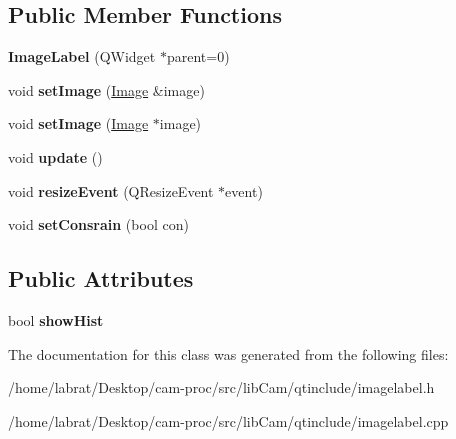 \subsection*{Public Member Functions}
\begin{DoxyCompactItemize}
\item 
{\bfseries Image\+Label} (Q\+Widget $\ast$parent=0)\hypertarget{classImageLabel_a01bf7ab77bbe3d5d3f58b1cdcccc8667}{}\label{classImageLabel_a01bf7ab77bbe3d5d3f58b1cdcccc8667}

\item 
void {\bfseries set\+Image} (\hyperlink{classImage}{Image} \&image)\hypertarget{classImageLabel_af04e4b40ac5eb1eb9b612540dd6466a1}{}\label{classImageLabel_af04e4b40ac5eb1eb9b612540dd6466a1}

\item 
void {\bfseries set\+Image} (\hyperlink{classImage}{Image} $\ast$image)\hypertarget{classImageLabel_a1960c3181366b630f54b36e50984f6fd}{}\label{classImageLabel_a1960c3181366b630f54b36e50984f6fd}

\item 
void {\bfseries update} ()\hypertarget{classImageLabel_a9831f92c604b3e847cd4c02cd861688c}{}\label{classImageLabel_a9831f92c604b3e847cd4c02cd861688c}

\item 
void {\bfseries resize\+Event} (Q\+Resize\+Event $\ast$event)\hypertarget{classImageLabel_a7b3da1fd9ca738eb988c7d5743bab2e4}{}\label{classImageLabel_a7b3da1fd9ca738eb988c7d5743bab2e4}

\item 
void {\bfseries set\+Consrain} (bool con)\hypertarget{classImageLabel_a43b166173e032a0b8558292f58200ae9}{}\label{classImageLabel_a43b166173e032a0b8558292f58200ae9}

\end{DoxyCompactItemize}
\subsection*{Public Attributes}
\begin{DoxyCompactItemize}
\item 
bool {\bfseries show\+Hist}\hypertarget{classImageLabel_a1f390a51abd622cb51c87dfc2a896cd3}{}\label{classImageLabel_a1f390a51abd622cb51c87dfc2a896cd3}

\end{DoxyCompactItemize}


The documentation for this class was generated from the following files\+:\begin{DoxyCompactItemize}
\item 
/home/labrat/\+Desktop/cam-\/proc/src/lib\+Cam/qtinclude/imagelabel.\+h\item 
/home/labrat/\+Desktop/cam-\/proc/src/lib\+Cam/qtinclude/imagelabel.\+cpp\end{DoxyCompactItemize}
